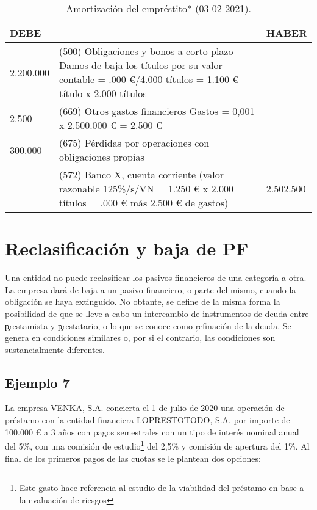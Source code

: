\begin{table}[H]
    \centering
    \begin{tabular}{|p{3cm}|p{6cm}|p{3cm}|}
    \hline
    \rowcolor{blue!30}
    \textbf{DEBE} & \textbf{} & \textbf{HABER} \\
    \hline
    2.200.000 & (500) Obligaciones y bonos a corto plazo \newline Damos de baja los títulos por su valor contable = \newline 4.400.000 €/4.000 títulos = 1.100 € título x 2.000 títulos & \\
    \hline
    2.500 & (669) Otros gastos financieros \newline Gastos = 0,001 x 2.500.000 € = 2.500 € & \\
    \hline
    300.000 & (675) Pérdidas por operaciones con obligaciones propias & \\
    \hline
    & (572) Banco X, cuenta corriente \newline (valor razonable 125\%/s/VN = 1.250 € x 2.000 títulos = \newline 2.500.000 € más 2.500 € de gastos) & 2.502.500 \\
    \hline
    \end{tabular}
    \caption{Amortización del empréstito* (03-02-2021).}
    \label{tabla:Asiento2-Ejercicio6-2}
\end{table}

\newpage 
\section{Reclasificación y baja de PF}

Una entidad no puede reclasificar los pasivos financieros de una categoría a otra. La empresa dará de baja a un pasivo financiero, o parte del mismo, cuando la obligación se haya extinguido. No obtante, se define de la misma forma la posibilidad de que se lleve a cabo un intercambio de instrumentos de deuda entre \c{prestamista} y \c{prestatario}, o lo que se conoce como \c{refinación de la deuda}. Se genera en condiciones similares o, por si el contrario, las condiciones son sustancialmente diferentes.




\subsection*{Ejemplo 7}

La empresa VENKA, S.A. concierta el 1 de julio de 2020 una operación de préstamo con la entidad financiera LOPRESTOTODO, S.A. por importe de 100.000 € a 3 años con pagos semestrales con un tipo de interés nominal anual del 5\%, con una comisión de estudio\footnote{Este gasto hace referencia al estudio de la viabilidad del préstamo en base a la evaluación de riesgos} del 2,5\% y comisión de apertura del 1\%. Al final de los primeros pagos de las cuotas se le plantean dos opciones:

